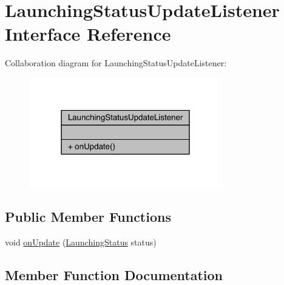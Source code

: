 \hypertarget{interfacecom_1_1toast_1_1android_1_1gamebase_1_1launching_1_1listeners_1_1_launching_status_update_listener}{}\section{Launching\+Status\+Update\+Listener Interface Reference}
\label{interfacecom_1_1toast_1_1android_1_1gamebase_1_1launching_1_1listeners_1_1_launching_status_update_listener}


Collaboration diagram for Launching\+Status\+Update\+Listener\+:
\nopagebreak
\begin{figure}[H]
\begin{center}
\leavevmode
\includegraphics[width=238pt]{interfacecom_1_1toast_1_1android_1_1gamebase_1_1launching_1_1listeners_1_1_launching_status_update_listener__coll__graph}
\end{center}
\end{figure}
\subsection*{Public Member Functions}
\begin{DoxyCompactItemize}
\item 
void \hyperlink{interfacecom_1_1toast_1_1android_1_1gamebase_1_1launching_1_1listeners_1_1_launching_status_update_listener_a19783d3b48f3a1e9b0554935b0576f4d}{on\+Update} (\hyperlink{classcom_1_1toast_1_1android_1_1gamebase_1_1launching_1_1data_1_1_launching_status}{Launching\+Status} status)
\end{DoxyCompactItemize}


\subsection{Member Function Documentation}
\mbox{\label{interfacecom_1_1toast_1_1android_1_1gamebase_1_1launching_1_1listeners_1_1_launching_status_update_listener_a19783d3b48f3a1e9b0554935b0576f4d}} 
